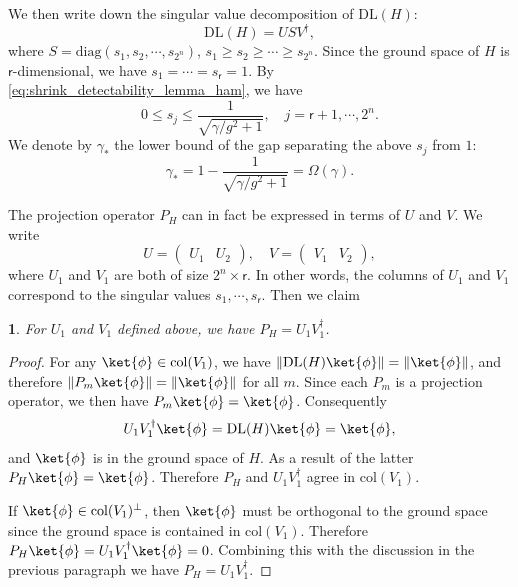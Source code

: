 \documentclass{article}
\theoremstyle{plain}
\newtheorem{lem}{\protect\lemmaname}
\theoremstyle{plain}
\theoremstyle{plain}
\theoremstyle{plain}
\theoremstyle{plain}
\theoremstyle{plain}
\theoremstyle{plain}
\providecommand{\lemmaname}{Lemma}
\begin{document}
We then write down the singular value decomposition of $\mathrm{DL}(H)$:
\begin{equation}
    \mathrm{DL}(H) = U S V^\dag,
\end{equation}
where $S = \mathrm{diag}(s_1,s_2,\cdots,s_{2^n})$, $s_1\geq s_2\geq\cdots \geq s_{2^n}$.
Since the ground space of $H$ is $\mathsf{r}$-dimensional, we have $s_1=\cdots=s_{\mathsf{r}}=1$. By \eqref{eq:shrink_detectability_lemma_ham}, we have
\begin{equation}
    \label{eq:singular_val_bound}
    0\leq s_j\leq \frac{1}{\sqrt{\gamma/g^2+1}}, \quad j=\mathsf{r}+1,\cdots,2^n.
\end{equation}
We denote by $\gamma_*$ the lower bound of the gap separating the above $s_j$ from $1$:
\begin{equation}
    \gamma_* = 1-\frac{1}{\sqrt{\gamma/g^2+1}} = \Omega(\gamma).
\end{equation}

The projection operator $P_H$ can in fact be expressed in terms of $U$ and $V$. We write 
\begin{equation}
\label{eq:U1_V1}
    U = \begin{pmatrix}
    U_1 & U_2
    \end{pmatrix},
    \quad
    V = \begin{pmatrix}
        V_1 & V_2
    \end{pmatrix},
\end{equation}
where $U_1$ and $V_1$ are both of size $2^n\times \mathsf{r}$. In other words, the columns of $U_1$ and $V_1$ correspond to the singular values $s_1,\cdots,s_{\mathsf{r}}$. Then we claim
\begin{lem}
    \label{lem:projection_operator_in_terms_of_UV}
    For $U_1$ and $V_1$ defined above, we have $P_H= U_1 V_1^\dag$.
\end{lem}
\begin{proof}
    For any $\ket{\phi}\in \mathrm{col}(V_1)$, we have $\|\mathrm{DL}(H)\ket{\phi}\|=\|\ket{\phi}\|$, and therefore $\|P_m\ket{\phi}\|=\|\ket{\phi}\|$ for all $m$. Since each $P_m$ is a projection operator, we then have $P_m\ket{\phi}=\ket{\phi}$. Consequently
    \[
    U_1 V_1^\dag\ket{\phi}=\mathrm{DL}(H)\ket{\phi}=\ket{\phi},
    \]
    and $\ket{\phi}$ is in the ground space of $H$. As a result of the latter $P_H\ket{\phi}=\ket{\phi}$. Therefore $P_H$ and $U_1V_1^\dag$ agree in $\mathrm{col}(V_1)$.
    
    If $\ket{\phi}\in \mathrm{col}(V_1)^\perp$, then $\ket{\phi}$ must be orthogonal to the ground space since the ground space is contained in $\mathrm{col}(V_1)$. Therefore $P_H\ket{\phi}=U_1V_1^\dag\ket{\phi}=0$. Combining this with the discussion in the previous paragraph we have $P_H=U_1 V_1^\dag$.
\end{proof}
\end{document}
